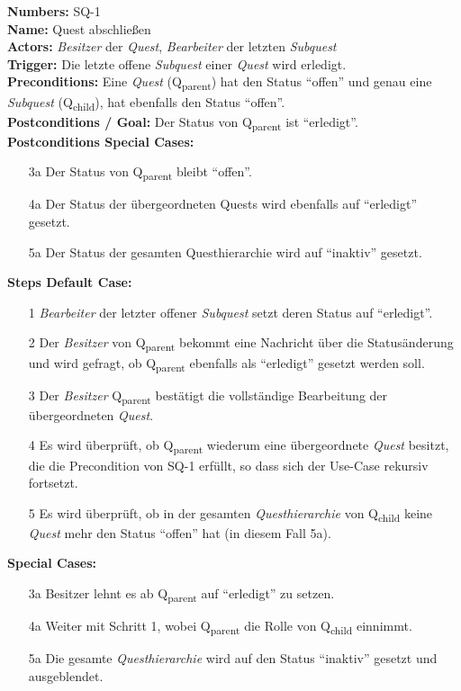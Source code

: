 \documentclass{article}
\begin{document}
\begin{samepage}
\textbf{Numbers:} SQ-1\\
\textbf{Name:} Quest abschließen\\
\textbf{Actors:} \textit{Besitzer} der \textit{Quest}, \textit{Bearbeiter} der letzten \textit{Subquest} \\
\textbf{Trigger:} Die letzte offene \textit{Subquest} einer \textit{Quest} wird erledigt.\\
\textbf{Preconditions:} Eine \textit{Quest} (Q\textsubscript{parent}) hat den Status ``offen'' und genau eine \textit{Subquest} (Q\textsubscript{child}), hat ebenfalls den Status ``offen''. \\
\textbf{Postconditions / Goal:} Der Status von Q\textsubscript{parent} ist ``erledigt''. \\
\textbf{Postconditions Special Cases:} 
\begin{itemize}
    \item[3a] Der Status von Q\textsubscript{parent} bleibt ``offen''. 
    \item[4a] Der Status der übergeordneten Quests wird ebenfalls auf ``erledigt'' gesetzt. 
    \item[5a] Der Status der gesamten Questhierarchie wird auf ``inaktiv'' gesetzt.
\end{itemize}
\textbf{Steps Default Case:}
\begin{itemize}
    \item[1] \textit{Bearbeiter} der letzter offener \textit{Subquest} setzt deren Status auf ``erledigt''.
    \item[2] Der \textit{Besitzer} von Q\textsubscript{parent} bekommt eine Nachricht über die Statusänderung und wird gefragt, ob Q\textsubscript{parent} ebenfalls  als ``erledigt'' gesetzt werden soll.
    \item[3] Der \textit{Besitzer} Q\textsubscript{parent} bestätigt die vollständige Bearbeitung der übergeordneten \textit{Quest}.
    \item[4] Es wird überprüft, ob Q\textsubscript{parent} wiederum eine übergeordnete \textit{Quest} besitzt, die die Precondition von SQ-1 erfüllt, so dass sich der Use-Case rekursiv fortsetzt. 
    \item[5] Es wird überprüft, ob in der gesamten \textit{Questhierarchie} von Q\textsubscript{child} keine \textit{Quest} mehr den Status ``offen'' hat (in diesem Fall 5a). 
\end{itemize}
\textbf{Special Cases:}
\begin{itemize}
\item [3a] Besitzer lehnt es ab  Q\textsubscript{parent} auf ``erledigt'' zu setzen.
\item [4a] Weiter mit Schritt 1, wobei Q\textsubscript{parent} die Rolle von Q\textsubscript{child} einnimmt. 
\item [5a] Die gesamte \textit{Questhierarchie} wird auf den Status ``inaktiv'' gesetzt und ausgeblendet. 
\end{itemize}
\end{samepage}
\end{document}
